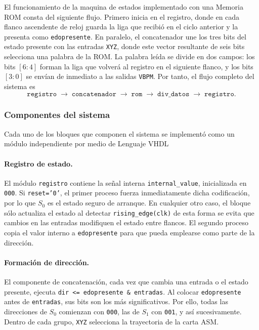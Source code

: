 \documentclass[letterpaper,12pt]{article}
\begin{document}
El funcionamiento de la maquina de estados implementado con una Memoria ROM consta del siguiente flujo. Primero inicia en el registro, donde en cada flanco ascendente de reloj guarda la liga que recibió en el ciclo anterior y la presenta como \texttt{edopresente}. En paralelo, el concatenador une los tres bits del estado presente con las entradas \texttt{XYZ}, donde  este vector resultante de seis bits selecciona una palabra de la ROM. La palabra leída se divide en dos campos: los bits $[6:4]$ forman la liga que volverá al registro en el siguiente flanco, y los bits $[3:0]$ se envían de inmediato a las salidas \texttt{VBPM}. Por tanto, el flujo completo del sistema es
\[
\texttt{registro}\;\longrightarrow\;\texttt{concatenador}\;\longrightarrow\;\texttt{rom}\;\longrightarrow\;\texttt{div\_datos}\;\longrightarrow\;\texttt{registro}.
\]

\subsubsection{Componentes del sistema}

Cada uno de los bloques que componen el sistema se implementó como un módulo independiente por medio de Lenguaje VHDL

\paragraph{Registro de estado.} El módulo \texttt{registro} contiene la señal interna \texttt{internal\_value}, inicializada en \texttt{000}. Si \texttt{reset='0'}, el primer proceso fuerza inmediatamente dicha codificación, por lo que $S_0$ es el estado seguro de arranque. En cualquier otro caso, el bloque sólo actualiza el estado al detectar \texttt{rising\_edge(clk)} de esta forma se evita que cambios en las entradas modifiquen el estado entre flancos. El segundo proceso copia el valor interno a \texttt{edopresente} para que pueda emplearse como parte de la dirección.



\paragraph{Formación de dirección.} El componente de concatenación, cada vez que cambia una entrada o el estado presente, ejecuta \texttt{dir <= edopresente \& entradas}. Al colocar \texttt{edopresente} antes de \texttt{entradas}, sus bits son los más significativos. Por ello, todas las direcciones de $S_0$ comienzan con \texttt{000}, las de $S_1$ con \texttt{001}, y así sucesivamente. Dentro de cada grupo, \texttt{XYZ} selecciona la trayectoria de la carta ASM.
\end{document}
